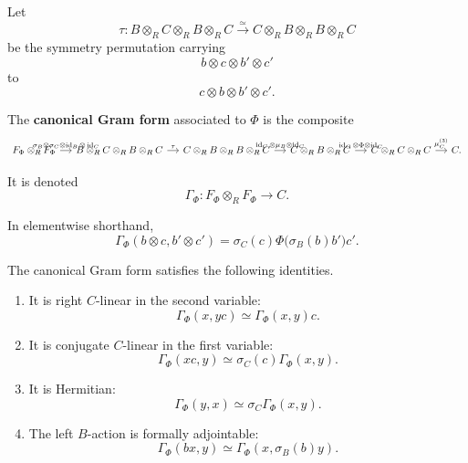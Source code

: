 Let
\[
  \tau:
  B\otimes_RC\otimes_RB\otimes_RC
  \xrightarrow{\simeq}
  C\otimes_RB\otimes_RB\otimes_RC
\]
be the symmetry permutation carrying
\[
  b\otimes c\otimes b'\otimes c'
\]
to
\[
  c\otimes b\otimes b'\otimes c'.
\]

\begin{definition}
\label{def:higher-canonical-gram-form}
The \textbf{canonical Gram form} associated to \(\Phi\) is the composite
\[
\begin{tikzcd}[column sep=small]
  F_\Phi\otimes_RF_\Phi
  \arrow[r,
    "{\sigma_B\otimes\sigma_C\otimes
    \operatorname{id}_B\otimes\operatorname{id}_C}"]
  &
  B\otimes_RC\otimes_RB\otimes_RC
  \arrow[r,"\tau"]
  &
  C\otimes_RB\otimes_RB\otimes_RC
  \arrow[r,
    "{\operatorname{id}_C\otimes\mu_B\otimes\operatorname{id}_C}"]
  &
  C\otimes_RB\otimes_RC
  \arrow[r,
    "{\operatorname{id}_C\otimes\Phi\otimes\operatorname{id}_C}"]
  &
  C\otimes_RC\otimes_RC
  \arrow[r,"\mu_C^{(3)}"]
  &
  C.
\end{tikzcd}
\]

It is denoted
\[
  \Gamma_\Phi:
  F_\Phi\otimes_RF_\Phi
  \longrightarrow
  C.
\]
\end{definition}

In elementwise shorthand,
\[
  \Gamma_\Phi
  (b\otimes c,b'\otimes c')
  =
  \sigma_C(c)
  \Phi\bigl(\sigma_B(b)b'\bigr)
  c'.
\]

\begin{proposition}
\label{prop:higher-gram-form-properties}
The canonical Gram form satisfies the following identities.

\begin{enumerate}
  \item It is right \(C\)-linear in the second variable:
  \[
    \Gamma_\Phi(x,yc)
    \simeq
    \Gamma_\Phi(x,y)c.
  \]

  \item It is conjugate \(C\)-linear in the first variable:
  \[
    \Gamma_\Phi(xc,y)
    \simeq
    \sigma_C(c)\Gamma_\Phi(x,y).
  \]

  \item It is Hermitian:
  \[
    \Gamma_\Phi(y,x)
    \simeq
    \sigma_C\Gamma_\Phi(x,y).
  \]

  \item The left \(B\)-action is formally adjointable:
  \[
    \Gamma_\Phi(bx,y)
    \simeq
    \Gamma_\Phi(x,\sigma_B(b)y).
  \]
\end{enumerate}
\end{proposition}

